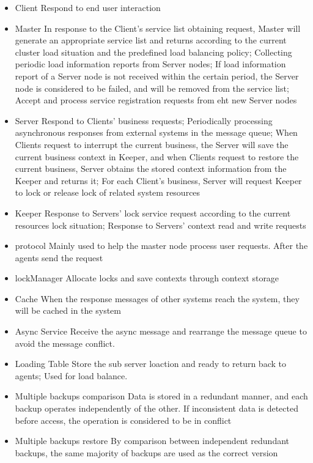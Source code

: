\documentclass{article}
\begin{document}
	\begin{itemize}
		\item{Client} Respond to end user interaction
		\item{Master} In response to the Client's service list obtaining request, Master will generate an appropriate service list and returns according to the current cluster load situation and the predefined load balancing policy; Collecting periodic load information reports from Server nodes; If load information report of a Server node is not received within the certain period, the Server node is considered to be failed, and will be removed from the service list; Accept and process service registration requests from eht new Server nodes			
		\item{Server} Respond to Clients' business requests; Periodically processing asynchronous responses from external systems  in the message queue; When Clients request to interrupt the current business, the Server will save the current business context in Keeper, and when Clients request to restore the current business, Server obtains the stored context information from the Keeper and returns it; For each Client's business, Server will request Keeper to lock or release lock of related system resources 			
		\item{Keeper} Response to Servers' lock service request according to the current resources lock situation; Response to Servers' context read and write requests			
		\item{protocol} Mainly used to help the master node process user requests. After the agents send the request
		\item{lockManager} Allocate locks and save contexts through context storage
		\item{Cache} When the response messages of other systems reach the system, they will be cached in the system
		\item{Async Service} Receive the async message and rearrange the message queue to avoid the message conflict.
		\item{Loading Table} Store the sub server loaction and ready to return back to agents; Used for load balance.
		\item{Multiple backups comparison} Data is stored in a redundant manner, and each backup operates independently of the other. If inconsistent data is detected before access, the operation is considered to be in conflict
		\item{Multiple backups restore} By comparison between independent redundant backups, the same majority of backups are used as the correct version

	\end{itemize}
\end{document}
